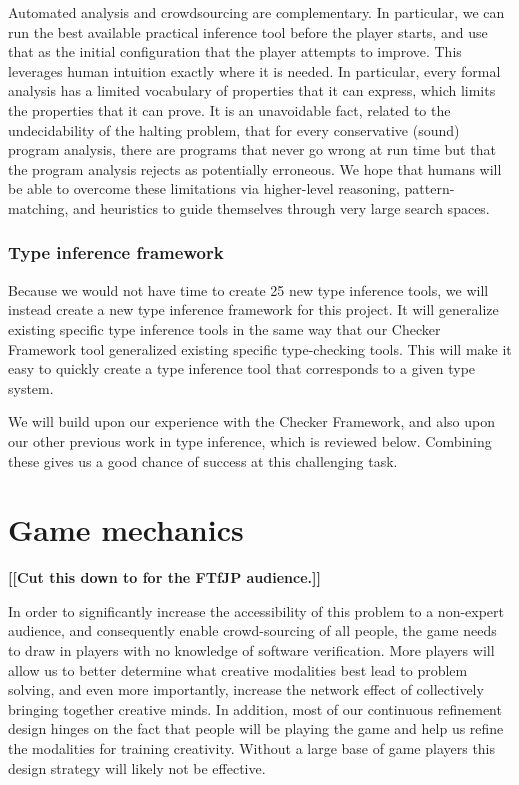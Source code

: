 \documentclass{sig-alternate}
\newcommand{\todo}[1]{{\color{red}\bfseries [[#1]]}}
\begin{document}
Automated analysis and crowdsourcing are complementary.  In particular,
we can run the best available practical inference tool before the player
starts, and use that as the initial configuration that the player attempts
to improve.  This leverages human intuition exactly where it is needed.  In
particular, every formal analysis has a limited vocabulary of properties
that it can express, which limits the properties that it can prove.  It is
an unavoidable fact, related to the undecidability of the halting problem,
that for every conservative (sound) program analysis, there are programs
that never go wrong at run time but that the program analysis rejects as
potentially erroneous.  We hope that humans will be able to overcome these
limitations via higher-level reasoning, pattern-matching, and heuristics to
guide themselves through very large search spaces.




\subsubsection{Type inference framework}
\label{sec:type-inference}

Because we would not have time to create 25 new type inference tools, we
will instead create a new type inference framework for this project.  It
will generalize existing specific type inference tools in the same way that
our Checker Framework tool generalized existing specific type-checking
tools.  This will make it easy to quickly create a type inference tool that
corresponds to a given type system.

We will build upon our experience with
the Checker Framework, and also upon our other previous work in type
inference, which is reviewed below.
Combining these gives us a good chance of success at this challenging task.




\section{Game mechanics}
\label{sec:game}

\todo{Cut this down to for the FTfJP audience.}

In order to significantly increase the accessibility of this problem
to a non-expert audience, and consequently enable crowd-sourcing of
all people, the game needs to draw in players with no knowledge of
software verification.  More players will allow us to better determine
what creative modalities best lead to problem solving, and even more
importantly, increase the network effect of collectively bringing
together creative minds. In addition, most of our continuous
refinement design hinges on the fact that people will be playing the
game and help us refine the modalities for training creativity.
Without a large base of game players this design strategy will likely
not be effective.
\end{document}
